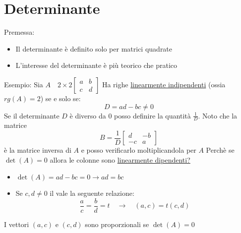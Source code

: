 \documentclass[12pt,a4paper,oneside]{article}
\begin{document}
\section{Determinante}
Premessa:
\begin{itemize}
	\item Il determinante è definito solo per matrici quadrate
	\item L'interesse del determinante è più teorico che pratico
\end{itemize}
Esempio:
Sia $A \quad 2 \times 2
	\begin{bmatrix}
		a & b \\
		c & d
	\end{bmatrix}
$
Ha righe \underline{linearmente indipendenti} (ossia $rg\left( A \right) =2$) se e solo se:
\[
	D=ad-bc \neq 0
\]
Se il determinante $D$ è diverso da 0 posso definire la quantità $\frac{1}{D}$. Noto che la matrice
\[
	B=\frac{1}{D}\begin{bmatrix} d & -b \\ -c & a \end{bmatrix}
\]
è la matrice inversa di $A$ e posso verificarlo moltiplicandola per $A$
\hr
Perchè se $ \det\left( A \right) = 0 $ allora le colonne sono \underline{linearmente dipendenti?}
\begin{itemize}
	\item $ \det\left( A \right) = ad-bc = 0  \rightarrow ad= bc$
	\item 	Se $ c, d \neq 0 $ il vale la seguente relazione:
	      \[
		      \frac{a}{c}=\frac{b}{d} = t \quad \rightarrow \quad \left( a,c \right) = t\left( c,d \right)
	      \]
\end{itemize}
I vettori $ \left( a,c \right)  $ e $ \left( c,d \right)  $ sono proporzionali se $ \det\left( A \right) =  0  $
\end{document}
